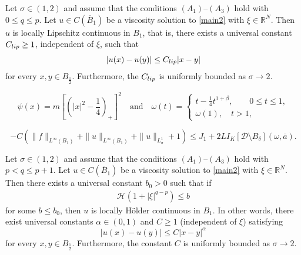 \documentclass[10pt,a4paper]{amsart}
\begin{document}
\begin{lemma}
\label{lem3-1}
Let $\sigma\in(1,2)$ and assume that the conditions $(A_1)$--$(A_3)$ hold with $0\le q\le p$. Let $u\in C(\overline{B}_1)$ be a viscosity solution to \eqref{main2} with $\xi\in\mathbb{R}^N$. Then $u$ is locally Lipschitz continuous in $B_1$, that is, there exists a universal constant $C_{\rm lip}\ge1$, independent of $\xi$, such that
$$
|u(x)-u(y)|\le C_{\rm lip}|x-y|
$$
for every $x,y\in B_{\frac12}$. Furthermore, the $C_{\rm lip}$ is uniformly bounded as $\sigma\rightarrow2$.
\end{lemma}

\begin{equation}
\label{3-1-1}
\psi(x)=m\left[\left(|x|^2-\frac{1}{4}\right)_+\right]^2 \quad\text{and}\quad \omega(t)=\begin{cases}t-\frac{1}{4}t^{1+\beta},\qquad0\le t\le1,\\
\omega(1),\quad t>1,
\end{cases}
\end{equation}

\begin{equation}
\label{3-1-6}
-C(\|f\|_{L^\infty(B_1)}+\|u\|_{L^\infty(B_1)}+\|u\|_{L^1_\sigma}+1)\le J_1+2LI_K[\mathcal{D}\setminus B_\delta](\omega,\overline{a}).
\end{equation}

\begin{lemma}
\label{lem3-2}
Let $\sigma\in(1,2)$ and assume that the conditions $(A_1)$--$(A_3)$ hold with $p< q\le p+1$. Let $u\in C(\overline{B}_1)$ be a viscosity solution to \eqref{main2} with $\xi\in\mathbb{R}^N$.
Then there exists a universal constant $b_0>0$ such that if
\begin{align}
\label{3-2-1}
\mathcal{H}(1+|\xi|^{q-p})\le b
\end{align}
for some $b\le b_0$, then $u$ is locally H\"{o}lder continuous in $B_1$.
In other words, there exist universal constants $\alpha\in(0,1)$ and $C\ge1$ (independent of $\xi$) satisfying
$$
|u(x)-u(y)|\le C|x-y|^\alpha
$$
for every $x,y\in B_{\frac12}$. Furthermore, the constant $C$ is uniformly bounded as $\sigma\rightarrow2$.
\end{lemma}
\end{document}
